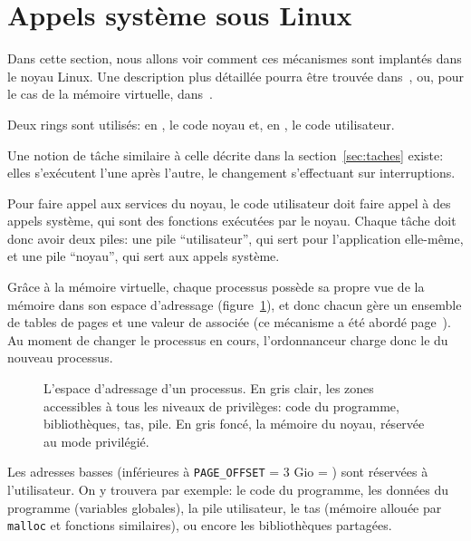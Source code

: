 \section{Appels système sous Linux}
\label{sec:linux-sys}


Dans cette section, nous allons voir comment ces mécanismes sont implantés dans
le noyau Linux. Une description plus détaillée pourra être trouvée
dans~\cite{UnderstandingTheLinuxKernel}, ou, pour le cas de la mémoire
virtuelle, dans~\cite{LinuxVMM}.

Deux rings sont utilisés: en , le code noyau et, en , le code
utilisateur.

Une notion de tâche similaire à celle décrite dans la section~\ref{sec:taches}
existe: elles s'exécutent l'une après l'autre, le changement s'effectuant sur
interruptions.

Pour faire appel aux services du noyau, le code utilisateur doit faire appel à
des appels système, qui sont des fonctions exécutées par le noyau. Chaque tâche
doit donc avoir deux piles: une pile \enquote{utilisateur}, qui sert pour
l'application elle-même, et une pile \enquote{noyau}, qui sert aux appels
système.

Grâce à la mémoire virtuelle, chaque processus possède sa propre vue de la
mémoire dans son espace d'adressage (figure~\ref{fig:memmap}), et donc chacun
gère un ensemble de tables de pages et une valeur de \crtrois{} associée (ce
mécanisme a été abordé page~\pageref{page:mem-virt}). Au moment de changer le
processus en cours, l'ordonnanceur charge donc le \crtrois{} du nouveau
processus.

\begin{figure}[b] %
\centering


\caption[Espace d'adressage d'un processus]{L'espace d'adressage d'un processus.
En gris clair, les zones accessibles à tous les niveaux de privilèges: code du
programme, bibliothèques, tas, pile. En gris foncé, la mémoire du noyau,
réservée au mode privilégié.}

\label{fig:memmap}
\end{figure}

Les adresses basses (inférieures à \texttt{PAGE\_OFFSET} = 3 Gio =
) sont réservées à l'utilisateur. On y trouvera par exemple:
le code du programme,
les données du programme (variables globales),
la pile utilisateur,
le tas (mémoire allouée par \texttt{malloc} et fonctions similaires), ou encore
les bibliothèques partagées.

